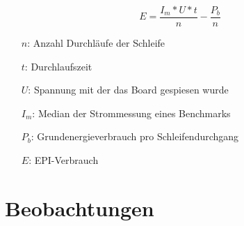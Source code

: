 \begin{minipage}{\textwidth}
\[ E = \frac{I_m * U * t}{n} - \frac{P_b}{n}\]
\hspace{1em}
\begin{itemize}
\itemsep1pt
    \item[$n$:] Anzahl Durchläufe der Schleife
    \item[$t$:] Durchlaufszeit
    \item[$U$:] Spannung mit der das Board gespiesen wurde
    \item[$I_m$:] Median der Strommessung eines Benchmarks
    \item[$P_b$:] Grundenergieverbrauch pro Schleifendurchgang
    \item[$E$:] EPI-Verbrauch
\end{itemize}
\end{minipage}









\section{Beobachtungen}

